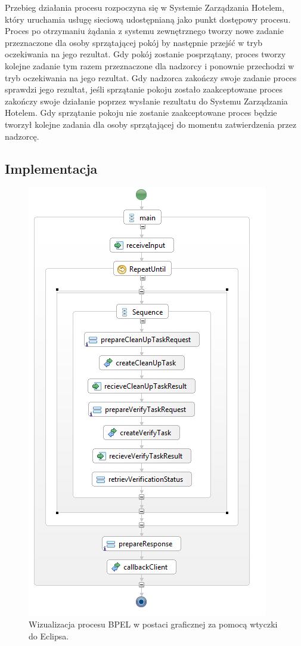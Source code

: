 Przebieg działania procesu rozpoczyna się w Systemie Zarządzania Hotelem, który uruchamia usługę sieciową udostępnianą jako punkt dostępowy procesu. Proces po otrzymaniu żądania z systemu zewnętrznego tworzy nowe zadanie przeznaczone dla osoby sprzątającej pokój by następnie przejść w tryb oczekiwania na jego rezultat. Gdy pokój zostanie posprzątany, proces tworzy kolejne zadanie tym razem przeznaczone dla nadzorcy i ponownie przechodzi w tryb oczekiwania na jego rezultat. Gdy nadzorca zakończy swoje zadanie proces sprawdzi jego rezultat, jeśli sprzątanie pokoju zostało zaakceptowane proces zakończy swoje działanie poprzez wysłanie rezultatu do Systemu Zarządzania Hotelem. Gdy sprzątanie pokoju nie zostanie zaakceptowane proces będzie tworzył  kolejne zadania dla osoby sprzątającej do momentu zatwierdzenia przez nadzorcę. 

\subsection{Implementacja}

\begin{figure}[h]
\centerline{\includegraphics[scale=0.6]{bpelProcess}}
\caption{Wizualizacja procesu BPEL w postaci graficznej za pomocą wtyczki do Eclipsa.}
\label{fig:bpelProcess}
\end{figure}

